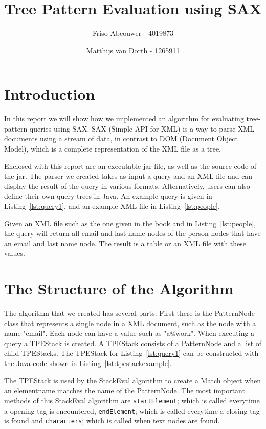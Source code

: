 \documentclass[11pt]{article}
\title{Tree Pattern Evaluation using SAX}
\author{Friso Abcouwer - 4019873 \and Matthijs van Dorth - 1265911}
\begin{document}
\maketitle

\section{Introduction}
In this report we will show how we implemented an algorithm for evaluating tree-pattern queries using SAX. SAX (Simple API for XML) is a way to parse XML documents using a stream of data, in contrast to DOM (Document Object Model), which is a complete representation of the XML file as a tree.

Enclosed with this report are an executable jar file, as well as the source code of the jar.
The parser we created takes as input a query and an XML file and can display the result of the query in various formats. Alternatively, users can also define their own query trees in Java.  An example query is given in Listing~\ref{lst:query1}, and an example XML file in Listing~\ref{lst:people}.



Given an XML file such as the one given in the book and in Listing~\ref{lst:people}, the query will return all email and last name nodes of the person nodes that have an email and last name node.
The result is a table or an XML file with these values.



\newpage
\section{The Structure of the Algorithm}
The algorithm that we created has several parts. First there is the PatternNode class that represents a single node in a XML document, such as the node with a name "email". Each node can have a value such as "a@work".
When executing a query a TPEStack is created. A TPEStack consists of a PatternNode and a list of child TPEStacks. The TPEStack for Listing~\ref{lst:query1} can be constructed with the Java code shown in Listing~\ref{lst:tpestackexample}. 



The TPEStack is used by the StackEval algorithm to create a Match object when an elementname matches the
name of the PatternNode. The most important methods of this StackEval algorithm are \lstinline{startElement}; which is called everytime a opening tag is encountered, \lstinline{endElement}; which is called everytime a closing tag is found and \lstinline{characters}; which is called when text nodes are found. 
\end{document}

